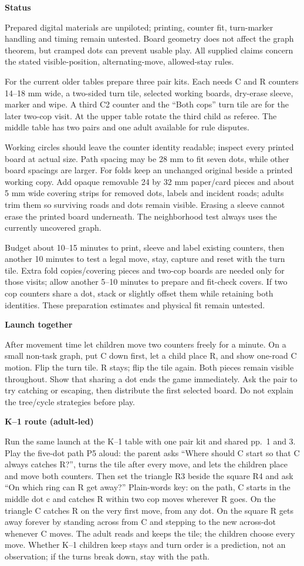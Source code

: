 \documentclass[11pt,letterpaper]{article}
\newcommand{\heading}[1]{\par\vspace{4pt}{\large\bfseries #1}\par}
\newcommand{\sub}[1]{\par\textbf{#1}\par}
\begin{document}
\sub{Status}
Prepared digital materials are unpiloted; printing, counter fit, turn-marker handling and timing remain untested. Board geometry does not affect the graph theorem, but cramped dots can prevent usable play. All supplied claims concern the stated visible-position, alternating-move, allowed-stay rules.
\newpage
\heading{Preparation and launch}
For the current older tables prepare three pair kits. Each needs C and R counters 14--18 mm wide, a two-sided turn tile, selected working boards, dry-erase sleeve, marker and wipe. A third C2 counter and the ``Both cops'' turn tile are for the later two-cop visit. At the upper table rotate the third child as referee. The middle table has two pairs and one adult available for rule disputes.

Working circles should leave the counter identity readable; inspect every printed board at actual size. Path spacing may be 28 mm to fit seven dots, while other board spacings are larger. For folds keep an unchanged original beside a printed working copy. Add opaque removable 24 by 32 mm paper/card pieces and about 5 mm wide covering strips for removed dots, labels and incident roads; adults trim them so surviving roads and dots remain visible. Erasing a sleeve cannot erase the printed board underneath. The neighborhood test always uses the currently uncovered graph.

Budget about 10--15 minutes to print, sleeve and label existing counters, then another 10 minutes to test a legal move, stay, capture and reset with the turn tile. Extra fold copies/covering pieces and two-cop boards are needed only for those visits; allow another 5--10 minutes to prepare and fit-check covers. If two cop counters share a dot, stack or slightly offset them while retaining both identities. These preparation estimates and physical fit remain untested.

\sub{Launch together}
After movement time let children move two counters freely for a minute. On a small non-task graph, put C down first, let a child place R, and show one-road C motion. Flip the turn tile. R stays; flip the tile again. Both pieces remain visible throughout. Show that sharing a dot ends the game immediately. Ask the pair to try catching or escaping, then distribute the first selected board. Do not explain the tree/cycle strategies before play.

\sub{K--1 route (adult-led)}
Run the same launch at the K--1 table with one pair kit and shared pp.~1 and 3. Play the five-dot path P5 aloud: the parent asks ``Where should C start so that C always catches R?'', turns the tile after every move, and lets the children place and move both counters. Then set the triangle R3 beside the square R4 and ask ``On which ring can R get away?'' Plain-words key: on the path, C starts in the middle dot c and catches R within two cop moves wherever R goes. On the triangle C catches R on the very first move, from any dot. On the square R gets away forever by standing across from C and stepping to the new across-dot whenever C moves. The adult reads and keeps the tile; the children choose every move. Whether K--1 children keep stays and turn order is a prediction, not an observation; if the turns break down, stay with the path.
\end{document}
